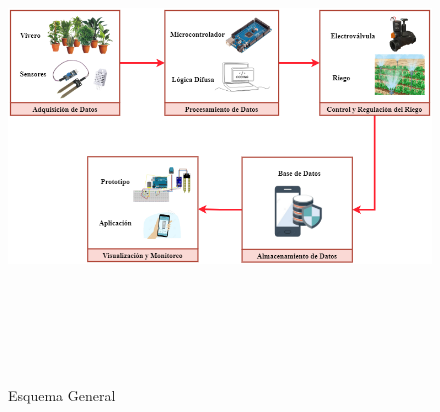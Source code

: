 \begin{figure}[H]
    \centering
    \includegraphics[width=15cm,height=13cm,keepaspectratio]{resources/images/esquema-general.png}
    \caption{Esquema General}\label{fig:esquema_general}
\end{figure}